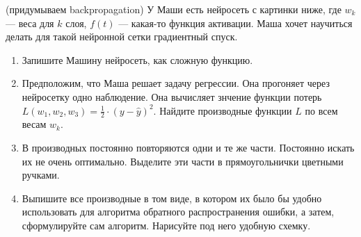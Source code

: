 \begin{problem}{(придумываем backpropagation)} 
    У Маши есть нейросеть с картинки ниже, где $w_k$ --- веса для $k$ слоя, $f(t)$ --- какая-то функция активации. Маша хочет научиться делать для такой нейронной сетки градиентный спуск.

    \begin{center}
    \end{center} 
    
    \begin{enumerate}
        \item  Запишите Машину нейросеть, как сложную функцию. 
    	
    	\item Предположим, что Маша решает задачу регрессии. Она прогоняет через нейросетку одно наблюдение. Она вычисляет знчение функции потерь $L(w_1, w_2, w_3) = \frac{1}{2} \cdot (y - \hat y)^2$.  Найдите производные функции $L$ по всем весам $w_k$. 
    	
    	\item В производных постоянно повторяются одни и те же части. Постоянно искать их не очень оптимально. Выделите эти части в прямоугольнички цветными ручками. 
    	
    	\item Выпишите все производные в том виде, в котором их было бы удобно использовать для алгоритма обратного распространения ошибки, а затем, сформулируйте сам алгоритм. Нарисуйте под него удобную схемку.
    \end{enumerate}
\end{problem}

